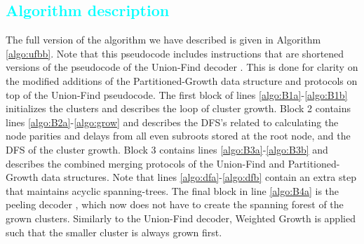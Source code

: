 


\subsection{\textcolor{cyan}{Algorithm description}}\label{sec:pseudocode}

The full version of the algorithm we have described is given in Algorithm \ref{algo:ufbb}. Note that this pseudocode includes instructions that are shortened versions of the pseudocode of the Union-Find decoder \cite{delfosse2017almost}. This is done for clarity on the modified additions of the Partitioned-Growth data structure and protocols on top of the Union-Find pseudocode. The first block of lines \ref{algo:B1a}-\ref{algo:B1b} initializes the clusters and describes the loop of cluster growth. Block 2 contains lines \ref{algo:B2a}-\ref{algo:grow} and describes the DFS's related to calculating the node parities and delays from all even subroots stored at the root node, and the DFS of the cluster growth. Block 3 contains lines \ref{algo:B3a}-\ref{algo:B3b} and describes the combined merging protocols of the Union-Find and Partitioned-Growth data structures. Note that lines \ref{algo:dfa}-\ref{algo:dfb} contain an extra step that maintains acyclic spanning-trees. The final block in line \ref{algo:B4a} is the peeling decoder \cite{delfosse2017linear}, which now does not have to create the spanning forest of the grown clusters. Similarly to the Union-Find decoder, Weighted Growth is applied such that the smaller cluster is always grown first. 

